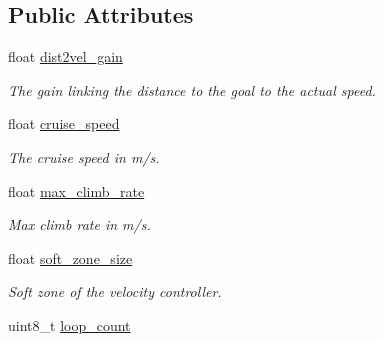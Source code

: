 \subsection*{Public Attributes}
\begin{DoxyCompactItemize}
\item 
\hypertarget{structnavigation__t_a7979ccef9876406dc0d019ba6eea78c7}{float \hyperlink{structnavigation__t_a7979ccef9876406dc0d019ba6eea78c7}{dist2vel\+\_\+gain}}\label{structnavigation__t_a7979ccef9876406dc0d019ba6eea78c7}

\begin{DoxyCompactList}\small\item\em The gain linking the distance to the goal to the actual speed. \end{DoxyCompactList}\item 
\hypertarget{structnavigation__t_af634621b34d805043c825f14fc5d356f}{float \hyperlink{structnavigation__t_af634621b34d805043c825f14fc5d356f}{cruise\+\_\+speed}}\label{structnavigation__t_af634621b34d805043c825f14fc5d356f}

\begin{DoxyCompactList}\small\item\em The cruise speed in m/s. \end{DoxyCompactList}\item 
\hypertarget{structnavigation__t_a688bc064f3aebcb75b8cf85766fed3a3}{float \hyperlink{structnavigation__t_a688bc064f3aebcb75b8cf85766fed3a3}{max\+\_\+climb\+\_\+rate}}\label{structnavigation__t_a688bc064f3aebcb75b8cf85766fed3a3}

\begin{DoxyCompactList}\small\item\em Max climb rate in m/s. \end{DoxyCompactList}\item 
\hypertarget{structnavigation__t_a6d508f3a655eae4b6def762fe2fab10c}{float \hyperlink{structnavigation__t_a6d508f3a655eae4b6def762fe2fab10c}{soft\+\_\+zone\+\_\+size}}\label{structnavigation__t_a6d508f3a655eae4b6def762fe2fab10c}

\begin{DoxyCompactList}\small\item\em Soft zone of the velocity controller. \end{DoxyCompactList}\item 
\hypertarget{structnavigation__t_adcba3a506087205ff707cfe0d8f312cd}{uint8\+\_\+t \hyperlink{structnavigation__t_adcba3a506087205ff707cfe0d8f312cd}{loop\+\_\+count}}\label{structnavigation__t_adcba3a506087205ff707cfe0d8f312cd}


\end{DoxyCompactItemize}
